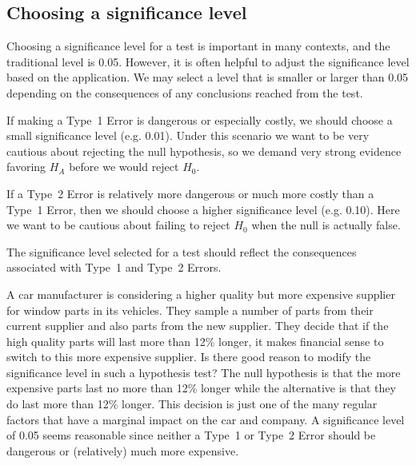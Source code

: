 \subsection{Choosing a significance level}
\label{significanceLevel}


Choosing a significance level for a test is important in many contexts, and the traditional level is 0.05. However, it is often helpful to adjust the significance level based on the application. We may select a level that is smaller or larger than 0.05 depending on the consequences of any conclusions reached from the test.

If making a Type~1 Error is dangerous or especially costly, we should choose a small significance level (e.g. 0.01). Under this scenario we want to be very cautious about rejecting the null hypothesis, so we demand very strong evidence favoring $H_A$ before we would reject $H_0$.

If a Type~2 Error is relatively more dangerous or much more costly than a Type~1 Error, then we should choose a higher significance level (e.g. 0.10). Here we want to be cautious about failing to reject $H_0$ when the null is actually false.

\begin{tipBox}{
The significance level selected for a test should reflect the consequences associated with Type~1 and Type~2 Errors.}
\end{tipBox}

\begin{example}{A car manufacturer is considering a higher quality but more expensive supplier for window parts in its vehicles. They sample a number of parts from their current supplier and also parts from the new supplier. They decide that if the high quality parts will last more than 12\% longer, it makes financial sense to switch to this more expensive supplier. Is there good reason to modify the significance level in such a hypothesis test?}
The null hypothesis is that the more expensive parts last no more than 12\% longer while the alternative is that they do last more than 12\% longer. This decision is just one of the many regular factors that have a marginal impact on the car and company. A significance level of 0.05 seems reasonable since neither a Type~1 or Type~2 Error should be dangerous or (relatively) much more expensive.
\end{example}

